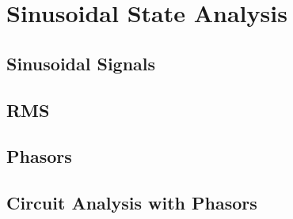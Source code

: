\chapter{Sinusoidal State Analysis}
\label{cha:sin_state_analysis}
    \section{Sinusoidal Signals}
    \section{RMS}
    \section{Phasors}
    \section{Circuit Analysis with Phasors}